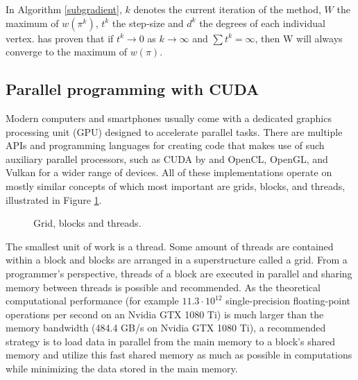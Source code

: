 \documentclass[english, 12pt, a4paper, sci, utf8, a-1b, online]{aaltothesis}
\begin{document}
In Algorithm \ref{subgradient}, $k$ denotes the current iteration of the method, $W$ the maximum of $w(\pi^k)$, $t^k$ the step-size and $d^k$ the degrees of each individual vertex. \cite{extopt} has proven that if $t^k \rightarrow 0$ as $k \rightarrow \infty$ and $\sum t^k = \infty$, then W will always converge to the maximum of $w(\pi)$.

\subsection{Parallel programming with CUDA}
Modern computers and smartphones usually come with a dedicated graphics processing unit (GPU) designed to accelerate parallel tasks. There are multiple APIs and programming languages for creating code that makes use of such auxiliary parallel processors, such as CUDA by \cite{cuda} and OpenCL, OpenGL, and Vulkan for a wider range of devices. All of these implementations operate on mostly similar concepts of which most important are grids, blocks, and threads, illustrated in Figure \ref{fig:parallel}.

\begin{figure}[H]
\centering
{}
\caption{Grid, blocks and threads.}
\label{fig:parallel}
\end{figure}

The smallest unit of work is a thread. Some amount of threads are contained within a block and blocks are arranged in a superstructure called a grid. From a programmer's perspective, threads of a block are executed in parallel and sharing memory between threads is possible and recommended. As the theoretical computational performance (for example $11.3 \cdot 10^{12}$ single-precision floating-point operations per second on an Nvidia GTX 1080 Ti) is much larger than the memory bandwidth (484.4 GB/s on Nvidia GTX 1080 Ti), a recommended strategy is to load data in parallel from the main memory to a block's shared memory and utilize this fast shared memory as much as possible in computations while minimizing the data stored in the main memory.
\end{document}
